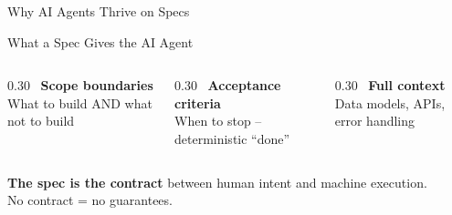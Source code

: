 \begin{frame}{Why AI Agents Thrive on Specs}
  \vspace{0.3cm}

  \begin{block}{What a Spec Gives the AI Agent}
    \scriptsize
    \begin{columns}[T]
      \begin{column}{0.30\textwidth}
        ~\textbf{Scope boundaries}\\%
        \tiny What to build AND what not to build
      \end{column}
      \begin{column}{0.30\textwidth}
        ~\textbf{Acceptance criteria}\\%
        \tiny When to stop -- deterministic ``done''
      \end{column}
      \begin{column}{0.30\textwidth}
        ~\textbf{Full context}\\%
        \tiny Data models, APIs, error handling
      \end{column}
    \end{columns}
  \end{block}

  \vspace{0.2cm}

  \begin{center}
    \colorbox{keylimeblue!10}{\parbox{0.8\textwidth}{\centering\scriptsize
      \textbf{The spec is the contract} between human intent and machine execution.\\
      No contract = no guarantees.
    }}
  \end{center}
\end{frame}
